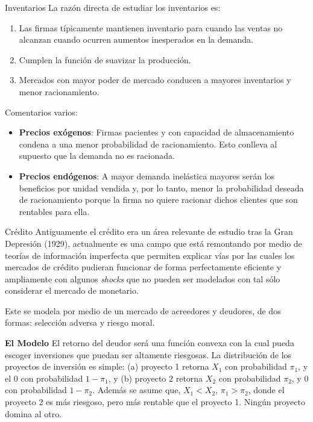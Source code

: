 \documentclass{beamer}
\begin{document}
\begin{frame}{Inventarios}
La raz\'on directa de estudiar los inventarios es:
\begin{enumerate}
\item{Las firmas t\'ipicamente mantienen inventario para cuando las ventas no alcanzan cuando ocurren aumentos inesperados en la demanda.}
\item{Cumplen la funci\'on de suavizar la producci\'on.}
\item{Mercados con mayor poder de mercado conducen a mayores inventarios y menor racionamiento.}
\end{enumerate}

\medskip
Comentarios varios:
\begin{itemize}
\item{\textbf{Precios ex\'ogenos}: Firmas pacientes y con capacidad de almacenamiento condena a una menor probabilidad de racionamiento. Esto conlleva al supuesto que la demanda no es racionada.}
\item{\textbf{Precios end\'ogenos}: A mayor demanda inel\'astica mayores ser\'an los beneficios por unidad vendida y, por lo tanto, menor la probabilidad deseada de racionamiento porque la firma no quiere racionar dichos clientes que son rentables para ella.}
\end{itemize}
\end{frame}

\begin{frame}{Cr\'edito}
Antiguamente el cr\'edito era un \'area relevante de estudio tras la Gran Depresi\'on (1929),  actualmente es una campo que est\'a remontando por medio de teor\'ias de informaci\'on imperfecta que permiten explicar v\'ias por las cuales los mercados de cr\'edito pudieran funcionar de forma perfectamente eficiente y ampliamente con algunos \emph{shocks} que no pueden ser modelados con tal s\'olo considerar el mercado de monetario.

\medskip
Este se modela por medio de un mercado de acreedores y deudores, de dos formas: selecci\'on adversa y riesgo moral.

\medskip
\textbf{El Modelo}
El retorno del deudor ser\'a una funci\'on convexa con la cual pueda escoger inversiones que puedan ser altamente riesgosas. La distribuci\'on de los proyectos de inversi\'on es simple: (a) proyecto 1 retorna $X_{1}$ con probabilidad $\pi_{1}$, y el $0$ con probabilidad $1-\pi_{1}$, y (b) proyecto 2 retorna $X_{2}$ con probabilidad $\pi_{2}$, y $0$ con probabilidad $1-\pi_{2}$. Adem\'as se asume que, $X_{1}<X_{2}$, $\pi_{1}>\pi_{2}$, donde el proyecto 2 es m\'as riesgoso, pero m\'as rentable que el proyecto 1. Ning\'un proyecto domina al otro.
\end{frame}
\end{document}
